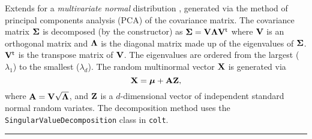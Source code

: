 
Extends  for a \emph{multivariate normal} distribution
\cite{tJOH72a}, generated via the method of principal components analysis
(PCA) of the covariance matrix. The covariance matrix $\boldsymbol{\Sigma}$ is 
decomposed (by the constructor) as $\boldsymbol{\Sigma} = \mathbf{V}\boldsymbol{\Lambda}\mathbf{V}^{\mathsf{t}}$ where
 $\mathbf{V}$ is an orthogonal matrix and $\boldsymbol{\Lambda}$ is the diagonal matrix made up
of the eigenvalues of $\boldsymbol{\Sigma}$. $\mathbf{V}^{\mathsf{t}}$ is the transpose 
matrix of $\mathbf{V}$. The eigenvalues are ordered from the
largest ($\lambda_1$) to the smallest ($\lambda_d$). The random multinormal
vector $\textbf{X}$ is generated via
\[
  \textbf{X} = \boldsymbol{\mu} + \textbf{A} \textbf{Z},
\]
where $\textbf{A} = \mathbf{V}\sqrt{\boldsymbol{\Lambda}}$, and $\textbf{Z}$ is a $d$-dimensional vector of
independent standard normal random variates. The decomposition method
uses the \texttt{SingularValueDecomposition} class in \texttt{colt}.


\bigskip\hrule

